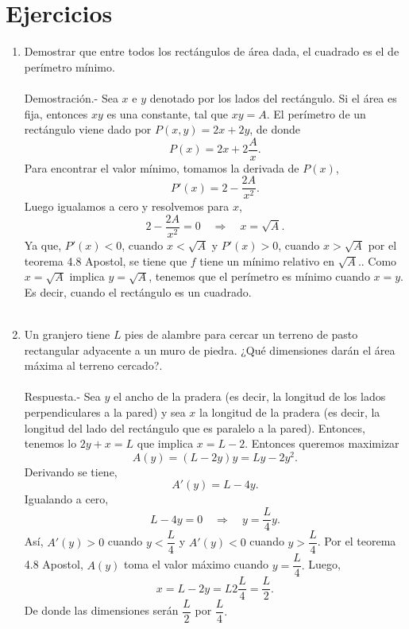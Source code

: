 \section{Ejercicios}

\begin{enumerate}[\bfseries 1.]

    \item Demostrar que entre todos los rectángulos de área dada, el cuadrado es el de perímetro mínimo.\\\\
	Demostración.-\; Sea $x$ e $y$ denotado por los lados del rectángulo. Si el área es fija, entonces $xy$ es una constante, tal que $xy=A$. El perímetro de un rectángulo viene dado por $P(x,y)=2x+2y$, de donde
	$$P(x)=2x+2\dfrac{A}{x}.$$
	Para encontrar el valor mínimo, tomamos la derivada de $P(x)$,
	$$P'(x)=2-\dfrac{2A}{x^2}.$$
	Luego igualamos a cero y resolvemos para $x$,
	$$2-\dfrac{2A}{x^2}=0\quad \Rightarrow \quad x=\sqrt{A}.$$
	Ya que, $P'(x)<0$, cuando $x<\sqrt{A}$ y $P'(x)>0$, cuando $x>\sqrt{A}$ por el teorema 4.8 Apostol, se tiene que $f$ tiene un mínimo relativo en $\sqrt{A}.$. Como $x=\sqrt{A}$ implica $y=\sqrt{A}$, tenemos que el perímetro es mínimo cuando $x=y$. Es decir, cuando el rectángulo es un cuadrado.\\\\

    \item Un granjero tiene $L$ pies de alambre para cercar un terreno de pasto rectangular adyacente a un muro de piedra. ¿Qué dimensiones darán el área máxima al terreno cercado?.\\\\
	Respuesta.-\; Sea $y$ el ancho de la pradera (es decir, la longitud de los lados perpendiculares a la pared) y sea $x$ la longitud de la pradera (es decir, la longitud del lado del rectángulo que es paralelo a la pared). Entonces, tenemos lo $2y + x = L$ que implica $x = L - 2$.  Entonces queremos maximizar
	$$A(y)=(L-2y)y=Ly-2y^2.$$
	Derivando se tiene,
	$$A'(y)=L-4y.$$
	Igualando a cero,
	$$L-4y=0\quad \Rightarrow \quad y=\dfrac{L}{4}y.$$ 
	Así, $A'(y)>0$ cuando $y<\dfrac{L}{4}$ y $A'(y)<0$ cuando $y>\dfrac{L}{4}$. Por el teorema 4.8 Apostol, $A(y)$ toma el valor máximo cuando $y=\dfrac{L}{4}.$ Luego,
	$$x=L-2y=L2\dfrac{L}{4}=\dfrac{L}{2}.$$
	De donde las dimensiones serán $\dfrac{L}{2}$ por $\dfrac{L}{4}.$\\\\


\end{enumerate}
